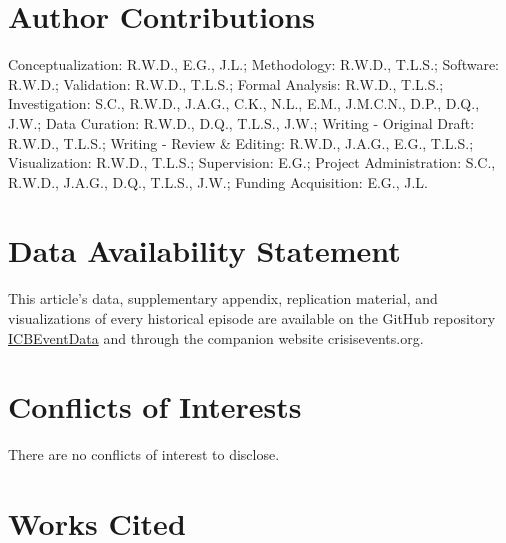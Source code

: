 \documentclass{article}
\begin{document}
\hypertarget{author-contributions}{%
\section{Author Contributions}\label{author-contributions}}

Conceptualization: R.W.D., E.G., J.L.; Methodology: R.W.D., T.L.S.;
Software: R.W.D.; Validation: R.W.D., T.L.S.; Formal Analysis: R.W.D.,
T.L.S.; Investigation: S.C., R.W.D., J.A.G., C.K., N.L., E.M., J.M.C.N.,
D.P., D.Q., J.W.; Data Curation: R.W.D., D.Q., T.L.S., J.W.; Writing -
Original Draft: R.W.D., T.L.S.; Writing - Review \& Editing: R.W.D.,
J.A.G., E.G., T.L.S.; Visualization: R.W.D., T.L.S.; Supervision: E.G.;
Project Administration: S.C., R.W.D., J.A.G., D.Q., T.L.S., J.W.;
Funding Acquisition: E.G., J.L.

\hypertarget{data-availability-statement}{%
\section{Data Availability
Statement}\label{data-availability-statement}}

This article's data, supplementary appendix, replication material, and
visualizations of every historical episode are available on the GitHub
repository
\href{https://urldefense.com/v3/__https://github.com/CenterForPeaceAndSecurityStudies/ICBEventData__;!!Mih3wA!WxDJtEczKfxGTh0S2Krunap8ReymFEL5iTWaSfOHeqlSdyfRx77zmjBSWO1OAm13$}{ICBEventData}
and through the companion website crisisevents.org.

\hypertarget{conflicts-of-interests}{%
\section{Conflicts of Interests}\label{conflicts-of-interests}}

There are no conflicts of interest to disclose.

\clearpage

\hypertarget{works-cited}{%
\section*{Works Cited}\label{works-cited}}
\end{document}

